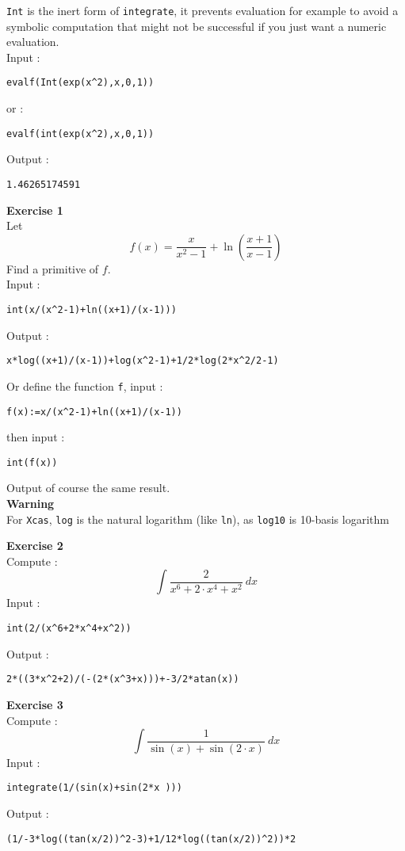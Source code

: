 \documentclass[a4paper,11pt]{book}
\begin{document}
{\tt Int} is the inert form of {\tt integrate}, it prevents evaluation
for example to avoid a symbolic computation that might not be
successful if you just want a numeric
evaluation.\\
Input :
\begin{center}{\tt evalf(Int(exp(x\verb|^|2),x,0,1))}\end{center}
or :
\begin{center}{\tt evalf(int(exp(x\verb|^|2),x,0,1))}\end{center}
Output  :
\begin{center}{\tt 1.46265174591}\end{center}

{\bf Exercise 1}\\
Let $$f(x)=\frac {x}{x^2-1}+\ln(\frac {x+1}{x-1})$$
Find a primitive of $f$.\\
Input :
\begin{center}{\tt int(x/(x\verb|^|2-1)+ln((x+1)/(x-1)))}\end{center}
Output : 
\begin{center}{\tt x*log((x+1)/(x-1))+log(x\verb|^|2-1)+1/2*log(2*x\verb|^|2/2-1)}\end{center}
Or define the function {\tt f}, input :
\begin{center}{\tt f(x):=x/(x\verb|^|2-1)+ln((x+1)/(x-1))}\end{center}
then input :
\begin{center}{\tt int(f(x))}\end{center}
Output of course the same result.\\
{\bf Warning}\\
For {\tt Xcas}, {\tt log} is the natural logarithm (like {\tt ln}),
as {\tt log10} is 10-basis logarithm

{\bf Exercise 2}\\
Compute :
$$\int \frac {2}{x^6+2 \cdot x^4+x^2} \ dx $$
Input :
\begin{center}{\tt int(2/(x\verb|^|6+2*x\verb|^|4+x\verb|^|2))}\end{center}
Output :
\begin{center}{\tt 2*((3*x\verb|^|2+2)/(-(2*(x\verb|^|3+x)))+-3/2*atan(x))}\end{center}

{\bf Exercise 3}\\
Compute :
$$\int \frac {1}{\sin(x)+\sin(2 \cdot x )} \ dx $$
Input :
\begin{center}{\tt integrate(1/(sin(x)+sin(2*x )))}\end{center}
Output :
\begin{center}{\tt (1/-3*log((tan(x/2))\verb|^|2-3)+1/12*log((tan(x/2))\verb|^|2))*2}\end{center} 
\end{document}

